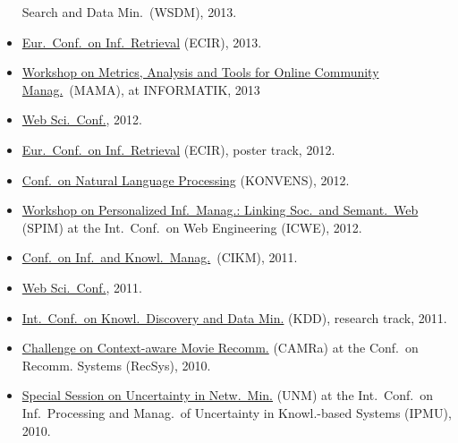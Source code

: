 \documentclass[line,mm]{res}
\newcounter{x}
\begin{document}
\begin{resume}
\begin{itemize}
  Search and Data Min.\ (WSDM), 2013.  
\item \href{http://ecir2013.org/}{Eur.\ Conf.\ on Inf.\ Retrieval} (ECIR), 2013.  
\item \href{http://mama.west.uni-koblenz.de/}{Workshop on Metrics,
  Analysis and Tools for Online Community Manag.}\ (MAMA), at
  INFORMATIK, 2013
\item \href{http://www.websci12.org/}{Web Sci.\ Conf.}, 2012. 
\item \href{http://ecir2012.upf.edu/}{Eur.\ Conf.\ on Inf.\ Retrieval} (ECIR), poster track, 2012.  
\item \href{http://www.oegai.at/konvens2012/}{Conf.\ on Natural Language
  Processing} (KONVENS), 2012. 
\item \href{http://spim-workshop.org/}{Workshop on Personalized
  Inf.\ Manag.: Linking Soc.\ and Semant.\ Web} (SPIM) at the
  Int.\ Conf.\ on Web Engineering (ICWE), 2012. 
\item \href{http://www.cikm2011.org/}{Conf.\ on Inf.\ and Knowl.\ Manag.}\ (CIKM), 2011.
\item \href{http://www.websci11.org/}{Web Sci.\ Conf.}, 2011.
\item \href{http://www.sigkdd.org/kdd/2011/}{Int.\ Conf.\ on 
  Knowl.\ Discovery and Data Min.} (KDD), research track, 2011.
\item \href{http://www.dai-labor.de/camra2010/}{Challenge on
  Context-aware Movie Recomm.} (CAMRa) at the Conf.\ on  
  Recomm. Systems (RecSys), 2010.   
\item \href{http://www.dai-labor.de/unm2010/}{Special Session on Uncertainty in Netw.\ Min.} (UNM) at the
  Int.\ Conf.\ on Inf.\ Processing and Manag.\ of
  Uncertainty in Knowl.-based Systems (IPMU), 2010. 
\end{itemize}


\end{resume}
\end{document}

